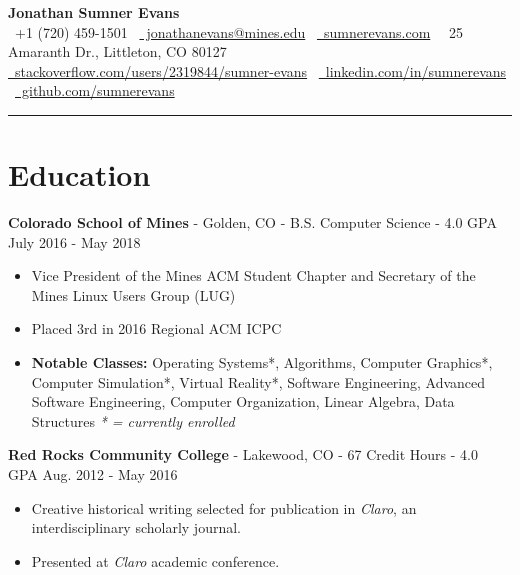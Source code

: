\documentclass[10.5pt,letterpaper]{article}
\begin{document}
\begin{center}
    \huge\textbf{Jonathan Sumner Evans} \\
    \vspace{3pt}
    \small \faPhone\ +1 (720) 459-1501
    \textbar\textbar\ \href{mailto:jonathanevans@mines.edu}{\faEnvelopeO\ jonathanevans@mines.edu}
    \textbar\textbar\ \href{http://sumnerevans.com}{\faGlobe\ sumnerevans.com}
    \textbar\textbar\ \faHome\ 25 Amaranth Dr., Littleton, CO 80127 \\
    \href{http://stackoverflow.com/users/2319844/sumner-evans}{\faStackOverflow\
    stackoverflow.com/users/2319844/sumner-evans}
    \textbar\textbar\ \href{https://www.linkedin.com/in/sumnerevans}{\faLinkedin\
    linkedin.com/in/sumnerevans}
    \textbar\textbar\ \href{https://github.com/sumnerevans}{\faGithub\
    github.com/sumnerevans}
    \rule{\textwidth}{0.5pt}
\end{center}

\section*{Education}
\textbf{Colorado School of Mines} - Golden, CO - B.S. Computer Science - 4.0 GPA
\hfill July 2016 - May 2018
\begin{itemize}
    \item Vice President of the Mines ACM Student Chapter and Secretary of the
        Mines Linux Users Group (LUG)
    \item Placed 3rd in 2016 Regional ACM ICPC
    \item \textbf{Notable Classes:} Operating Systems*, Algorithms, Computer
        Graphics*, Computer Simulation*, Virtual Reality*, Software Engineering,
        Advanced Software Engineering, Computer Organization, Linear Algebra,
        Data Structures \hfill\textit{* = currently enrolled}
\end{itemize}

\vspace{4pt}
\textbf{Red Rocks Community College} - Lakewood, CO - 67 Credit Hours - 4.0 GPA
\hfill Aug. 2012 - May 2016
\begin{itemize}
    \item Creative historical writing selected for publication in
        \textit{Claro}, an interdisciplinary scholarly journal.
    \item Presented at \textit{Claro} academic conference.
\end{itemize}
\end{document}
